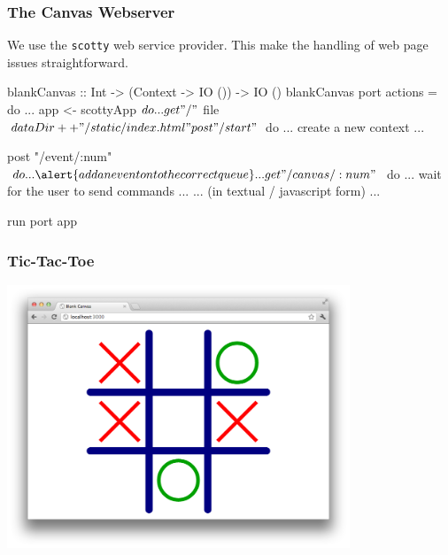 \documentclass{beamer}
\begin{document}
\begin{frame}[fragile]
\frametitle{The Canvas Webserver}

We use the {\tt scotty} web service provider. This make the handling 
of web page issues straightforward.

\begin{codeblock}[0.6]
\tiny
\begin{semiverbatim}
blankCanvas :: Int -> (Context -> IO ()) -> IO ()
blankCanvas port actions = do
   ...
   app <- scottyApp $ do
        ...

        get "/" $ file $ dataDir ++ "/static/index.html"
        
        post "/start" $ do
            ... \alert{create a new context} ...

        post "/event/:num" $ do
             ... \alert{add an event onto the correct queue} ...

        get "/canvas/:num" $ do
            ... \alert{wait for the user to send commands} ...
            ... (in textual / javascript form) ...

   run port app
\end{semiverbatim}
\end{codeblock}

\end{frame}

\begin{frame}[fragile]
\frametitle{Tic-Tac-Toe}

\centering
\includegraphics[width=290pt]{xox.png}


\end{frame}
\end{document}
